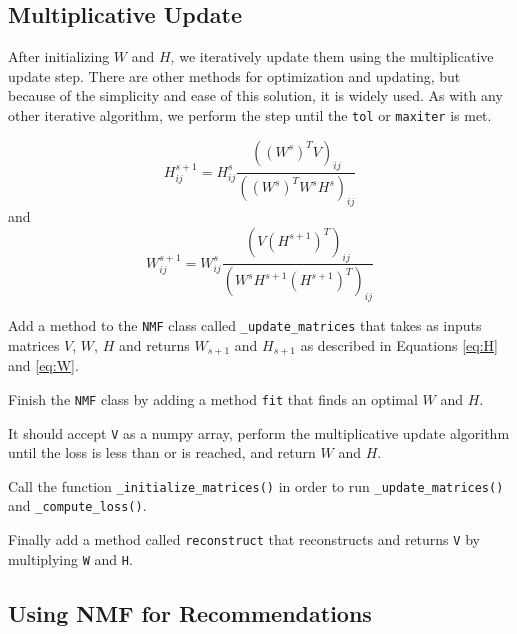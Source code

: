 \subsection*{Multiplicative Update}
After initializing $W$ and $H$, we iteratively update them using the multiplicative update step. 
There are other methods for optimization and updating, but because of the simplicity and ease of this solution, it is widely used.
As with any other iterative algorithm, we perform the step until the \texttt{tol} or \texttt{maxiter} is met.

\begin{equation}
H^{s+1}_{ij} = H^{s}_{ij} \frac{((W^s)^T V)_{ij}}{((W^{s})^{T}W^sH^s)_{ij}} 
\label{eq:H}
\end{equation}
and
\begin{equation}
W^{s+1}_{ij} = W^{s}_{ij} \frac{(V(H^{s+1})^T)_{ij}}{(W^{s}H^{s+1}(H^{s+1})^{T})_{ij}}
\label{eq:W}
\end{equation}



\begin{problem}
Add a method to the \texttt{NMF} class called \texttt{\_update\_matrices} that takes as inputs matrices $V$, $W$, $H$ and returns $W_{s+1}$ and $H_{s+1}$ as described in Equations \ref{eq:H} and \ref{eq:W}.
\end{problem}

\begin{problem}
Finish the \texttt{NMF} class by adding a method \texttt{fit} that finds an optimal $W$ and $H$. 

It should accept \texttt{V} as a numpy array, perform the multiplicative update algorithm until the loss is less than  or  is reached, and return $W$ and $H$. 

Call the function \texttt{\_initialize\_matrices()} in order to run \texttt{\_update\_matrices()} and \texttt{\_compute\_loss()}.

Finally add a method called \texttt{reconstruct} that reconstructs and returns \texttt{V} by multiplying \texttt{W} and \texttt{H}.  
\end{problem}

\subsection*{Using NMF for Recommendations}

